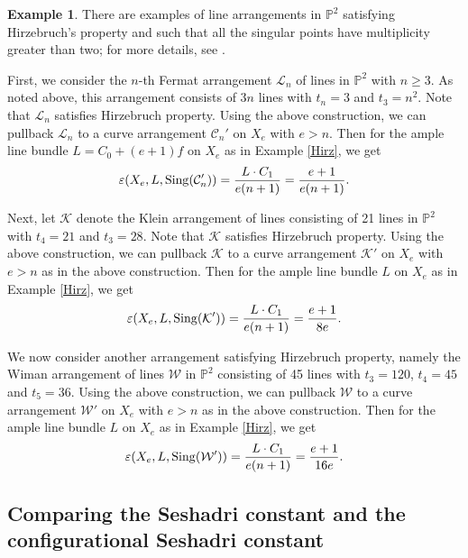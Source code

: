 \documentclass[12pt,reqno]{amsart}
\theoremstyle{plain}
\numberwithin{equation}{section}
\theoremstyle{definition}
\newtheorem{example}[theorem]{Example}
\begin{document}
	\begin{example}\label{KCW}
		There are examples of line arrangements in $\mathbb{P}^2$ satisfying Hirzebruch's property and such that all the singular points have multiplicity greater than two; for more details, see \cite{Pok}. 
		
		First, we consider the $n$-th Fermat arrangement $\mathcal{L}_n $ of lines  in $\mathbb{P}^2$  with $n \geq 3$. %
		As noted above, this arrangement consists of $3n$ lines with $t_n=3$ and $t_3=n^2.$ Note that $\mathcal{L}_n$ satisfies Hirzebruch property. Using the above construction, we can pullback $\mathcal{L}_n$ to a curve arrangement  $\mathcal{C}_n'$ on $X_e$ with $e > n$. Then for the ample line bundle $L=C_0+(e+1)f$ on $X_e$ as in Example \ref{Hirz}, we get
		$$\varepsilon(X_e, L,{\rm Sing}(\mathcal{C}_n')) = \frac{L\cdot C_1}{e(n+1)}=\frac{e+1}{e(n+1)}.$$
		
		Next,  let $\mathcal{K} $ denote the Klein arrangement of lines consisting of 21 lines in $\mathbb{P}^2$ with $t_4=21$ and $t_3=28.$ Note that $\mathcal{K}$ satisfies Hirzebruch property. Using the above construction, we can pullback $\mathcal{K}$ to a curve arrangement  $\mathcal{K}'$ on $X_e$ with $e > n$ as in the above construction. Then for the ample line bundle $L$ on $X_e$ as in Example \ref{Hirz}, we get
		$$\varepsilon(X_e, L,{\rm Sing}(\mathcal{K}')) = \frac{L\cdot C_1}{e(n+1)}=\frac{e+1}{8e}.$$
		
		We now consider another arrangement satisfying Hirzebruch property, namely the Wiman arrangement of lines $\mathcal{W}$ in $\mathbb{P}^2$ consisting of 45 lines with $t_3=120$, $t_4=45$ and $t_5=36.$ Using the above construction, we can pullback $\mathcal{W}$ to a curve arrangement  $\mathcal{W}'$ on $X_e$ with $e > n$ as in the above construction. Then for the ample line bundle $L$ on $X_e$ as in Example \ref{Hirz}, we get
		$$\varepsilon(X_e, L,{\rm Sing}(\mathcal{W}')) = \frac{L\cdot C_1}{e(n+1)}=\frac{e+1}{16e}.$$
	\end{example}

	
	\subsection{Comparing the Seshadri constant and the configurational Seshadri constant} \label{compare}
	
\end{document}
